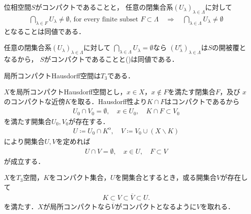 	\begin{screen}
		\begin{thm}[有限交叉性]\label{thm:finite_intersection_property}
			位相空間$S$がコンパクトであることと，
			任意の閉集合系$(U_\lambda)_{\lambda \in \Lambda}$に対して
			\begin{align} 
				\bigcap_{\lambda \in F} U_\lambda \neq \emptyset
				\mbox{, for every finite subset $F \subset \Lambda$}
				\quad \Longrightarrow \quad \bigcap_{\lambda \in \Lambda} U_\lambda \neq \emptyset
				\label{eq:finite_intersection_property}
			\end{align}
			となることは同値である．
		\end{thm}
	\end{screen}
	
	\begin{prf}
		任意の閉集合系$(U_\lambda)_{\lambda \in \Lambda}$に対して
		$\bigcap_{\lambda \in \Lambda} U_\lambda = \emptyset$なら
		$(U_\lambda^c)_{\lambda \in \Lambda}$は$S$の開被覆となるから，
		$S$がコンパクトであることと()は同値である．
		\QED
	\end{prf}
	
	\begin{screen}
		\begin{thm}[局所コンパクトHausdorff空間の正則性]\label{thm:regularity_of_Hausdorff_spaces}
			局所コンパクトHausdorff空間は$T_3$である．
		\end{thm}
	\end{screen}
	
	\begin{prf}
		$X$を局所コンパクトHausdorff空間とし，$x \in X$，$x \notin F$を満たす閉集合$F$，及び
		$x$のコンパクトな近傍$K$を取る．Hausdorff性より$K \cap F$はコンパクトであるから
		\begin{align}
			U_0 \cap V_0 = \emptyset, \quad x \in U_0,  \quad K \cap F \subset V_0
		\end{align}
		を満たす開集合$U_0,V_0$が存在する．
		\begin{align}
			U \coloneqq U_0 \cap K^{\mathrm{o}},
			\quad V \coloneqq V_0 \cup (X \backslash K)
		\end{align}
		により開集合$U,V$を定めれば
		\begin{align}
			U \cap V = \emptyset,
			\quad x \in U,
			\quad F \subset V
		\end{align}
		が成立する．
		\QED
	\end{prf}
	
	\begin{screen}
		\begin{thm}\label{thm:T_3_space}
			$X$を$T_3$空間，$K$をコンパクト集合，$U$を開集合とするとき，或る開集合$V$が存在して
			\begin{align}
				K \subset V \subset \overline{V} \subset U.
				\label{eq:thm_regularity_of_Hausdorff_spaces}
			\end{align}
			を満たす．$X$が局所コンパクトなら$\overline{V}$がコンパクトとなるように$V$を取れる．
		\end{thm}
	\end{screen}
		
